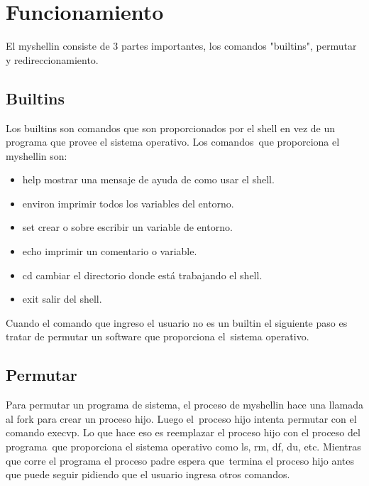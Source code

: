 \section{Funcionamiento}
El myshellin consiste de 3 partes importantes, los comandos "builtins", permutar y redireccionamiento.

\subsection{Builtins}
Los builtins son comandos que son proporcionados por el shell en vez de un programa que provee el sistema operativo. Los comandos\
que proporciona el myshellin son:
\begin{itemize}
    \item help \newline \Quad mostrar una mensaje de ayuda de como usar el shell.
    \item environ \newline \Quad imprimir todos los variables del entorno.
    \item set \newline \Quad crear o sobre escribir un variable de entorno.
    \item echo \newline \Quad imprimir un comentario o variable.
    \item cd \newline \Quad cambiar el directorio donde está trabajando el shell.
    \item exit \newline \Quad salir del shell.
\end{itemize}

Cuando el comando que ingreso el usuario no es un builtin el siguiente paso es tratar de permutar un software que proporciona el\
sistema operativo.

\subsection{Permutar}
Para permutar un programa de sistema, el proceso de myshellin hace una llamada al fork para crear un proceso hijo. Luego el\
proceso hijo intenta permutar con el comando execvp. Lo que hace eso es reemplazar el proceso hijo con el proceso del programa\
que proporciona el sistema operativo como ls, rm, df, du, etc. Mientras que corre el programa el proceso padre espera que\
termina el proceso hijo antes que puede seguir pidiendo que el usuario ingresa otros comandos.

